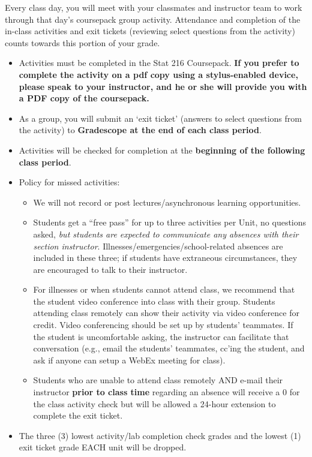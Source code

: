 \documentclass[
]{article}
\providecommand{\tightlist}{%
  \setlength{\itemsep}{0pt}\setlength{\parskip}{0pt}}
\begin{document}
Every class day, you will meet with your classmates and instructor team
to work through that day's coursepack group activity. Attendance and
completion of the in-class activities and exit tickets (reviewing select
questions from the activity) counts towards this portion of your grade.

\begin{itemize}
\tightlist
\item
  Activities must be completed in the Stat 216 Coursepack. \textbf{If
  you prefer to complete the activity on a pdf copy using a
  stylus-enabled device, please speak to your instructor, and he or she
  will provide you with a PDF copy of the coursepack.}
\item
  As a group, you will submit an `exit ticket' (answers to select
  questions from the activity) to \textbf{Gradescope at the end of each
  class period}.
\item
  Activities will be checked for completion at the \textbf{beginning of
  the following class period}.
\item
  Policy for missed activities:

  \begin{itemize}
  \tightlist
  \item
    We will not record or post lectures/asynchronous learning
    opportunities.
  \item
    Students get a ``free pass'' for up to three activities per Unit, no
    questions asked, \emph{but students are expected to communicate any
    absences with their section instructor}.
    Illnesses/emergencies/school-related absences are included in these
    three; if students have extraneous circumstances, they are
    encouraged to talk to their instructor.
  \item
    For illnesses or when students cannot attend class, we recommend
    that the student video conference into class with their group.
    Students attending class remotely can show their activity via video
    conference for credit. Video conferencing should be set up by
    students' teammates. If the student is uncomfortable asking, the
    instructor can facilitate that conversation (e.g., email the
    students' teammates, cc'ing the student, and ask if anyone can setup
    a WebEx meeting for class).
  \item
    Students who are unable to attend class remotely AND e-mail their
    instructor \textbf{prior to class time} regarding an absence will
    receive a 0 for the class activity check but will be allowed a
    24-hour extension to complete the exit ticket.
  \end{itemize}
\item
  The three (3) lowest activity/lab completion check grades and the
  lowest (1) exit ticket grade EACH unit will be dropped.
\end{itemize}
\end{document}
